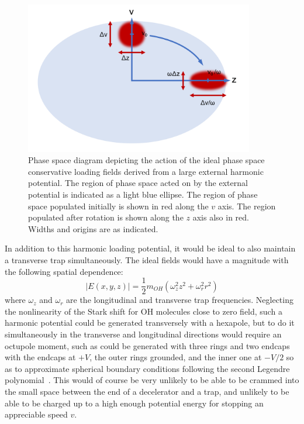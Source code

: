 \documentclass[defaultstyle,11pt]{thesis}
\begin{document}
\begin{figure}[t!]
\centering
\includegraphics[width=10cm]{LoadingRotation.png}
\caption[Ideal Trap Loading as a Quarter Rotation]{\label{LoadingRotation}
Phase space diagram depicting the action of the ideal phase space conservative loading fields derived from a large external harmonic potential. The region of phase space acted on by the external potential is indicated as a light blue ellipse. The region of phase space populated initially is shown in red along the $v$ axis. The region populated after rotation is shown along the $z$ axis also in red. Widths and origins are as indicated.
}
\end{figure}

In addition to this harmonic loading potential, it would be ideal to also maintain a transverse trap simultaneously. 
The ideal fields would have a magnitude with the following spatial dependence:
\begin{equation}
|E(x,y,z)| = \frac{1}{2}m_{OH}\left(\omega_z^2z^2 + \omega_r^2r^2\right)
\end{equation}
where $\omega_z$ and $\omega_r$ are the longitudinal and transverse trap frequencies.
Neglecting the nonlinearity of the Stark shift for OH molecules close to zero field, such a harmonic potential could be generated transversely with a hexapole, but to do it simultaneously in the transverse and longitudinal directions would require an octupole moment, such as could be generated with three rings and two endcaps with the endcaps at $+V$, the outer rings grounded, and the inner one at $-V/2$ so as to approximate spherical boundary conditions following the second Legendre polynomial~\cite{jackson1999classical}.
This would of course be very unlikely to be able to be crammed into the small space between the end of a decelerator and a trap, and unlikely to be able to be charged up to a high enough potential energy for stopping an appreciable speed $v$.
\end{document}

